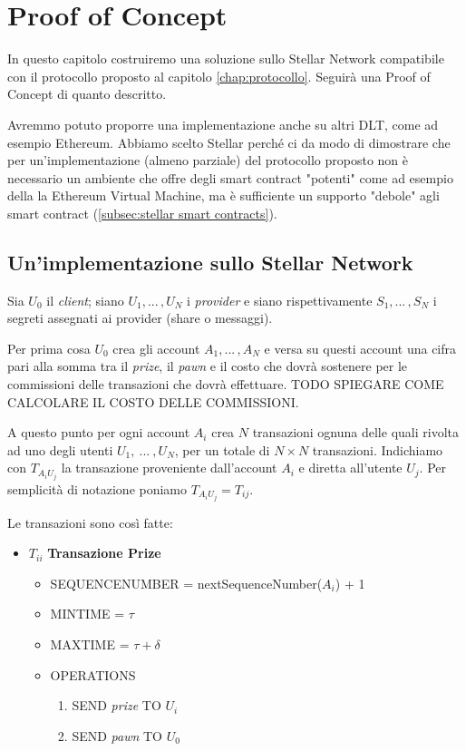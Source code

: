 \chapter{Proof of Concept}

In questo capitolo costruiremo una soluzione sullo Stellar Network
compatibile con il protocollo proposto al capitolo \ref{chap:protocollo}.
Seguirà una Proof of Concept di quanto descritto.

Avremmo potuto proporre una
implementazione anche su altri DLT, come ad esempio Ethereum. Abbiamo scelto
Stellar perché ci da modo di dimostrare che per un'implementazione (almeno parziale)
del protocollo proposto non è necessario un ambiente che
offre degli smart contract "potenti" come ad esempio
della la Ethereum Virtual Machine,
ma è sufficiente un supporto
"debole" agli smart contract (\ref{subsec:stellar smart contracts}).


\section{Un'implementazione sullo Stellar Network}
Sia $ U_0 $ il \textit{client};
siano $ U_1, ...\, , U_N $ i \textit{provider} e
siano rispettivamente $ S_1, ...\, , S_N $ i segreti assegnati ai provider
(share o messaggi).

Per prima cosa $ U_0 $ crea gli account $ A_1, ...\, , A_N $ e
versa su questi account una cifra pari alla somma tra
il \textit{prize}, il \textit{pawn} e il costo che dovrà sostenere per le commissioni
delle transazioni che dovrà effettuare.
TODO SPIEGARE COME CALCOLARE IL COSTO DELLE COMMISSIONI.

A questo punto per ogni account $ A_i $ crea $ N $ transazioni
ognuna delle quali rivolta ad uno degli utenti $ U_1,\ ...\ , U_N $, per un totale
di $ N \times N $ transazioni. Indichiamo con $ T_{{A_i}{U_j}} $ la transazione
proveniente dall'account $ A_i $ e diretta all'utente $ U_j $.
Per semplicità di notazione poniamo $ T_{{A_i}{U_j}} = T_{ij} $.

Le transazioni sono così fatte:
\begin{itemize}
	\item $T_{ii} $ \textbf{Transazione Prize}
	      \begin{itemize}
		      \item SEQUENCE\textunderscore NUMBER = nextSequenceNumber($ A_i $) + 1
		      \item MIN\textunderscore TIME = $ \tau $
		      \item MAX\textunderscore TIME = $ \tau + \delta $
		      \item OPERATIONS
		            \begin{enumerate}
			            \item SEND \textit{prize} TO $ U_i $
			            \item SEND \textit{pawn} TO $ U_0 $
		            \end{enumerate}
	      \end{itemize}
\end{itemize}

